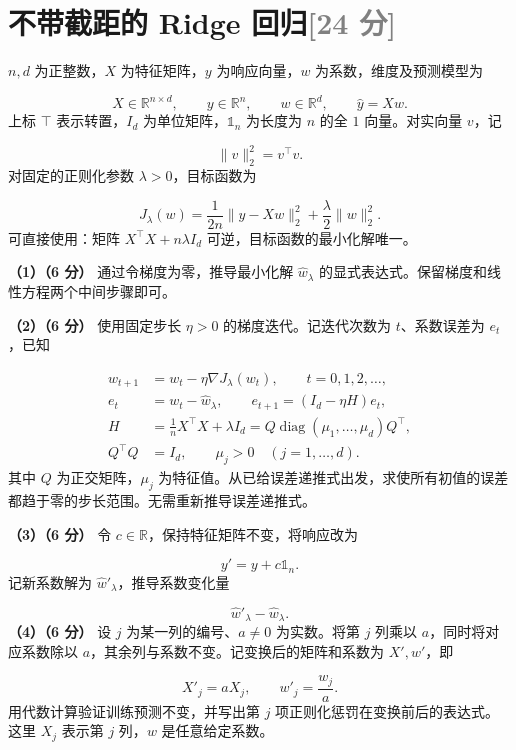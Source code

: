 \documentclass[11pt,a4paper]{article}
\begin{document}
\par\addvspace{1.2em}\noindent\begin{minipage}{\linewidth}
\section[不带截距的 Ridge 回归（24 分）]{不带截距的 Ridge 回归\hfill\textcolor{gray}{[24 分]}}
$n,d$ 为正整数，$X$ 为特征矩阵，$y$ 为响应向量，$w$ 为系数，维度及预测模型为


\[
X\in\mathbb R^{n\times d},\qquad y\in\mathbb R^n,\qquad
w\in\mathbb R^d,\qquad \widehat y=Xw.
\]
上标 $\top$ 表示转置，$I_d$ 为单位矩阵，$\mathds{1}_n$ 为长度为 $n$ 的全 $1$ 向量。对实向量 $v$，记


\[
\|v\|_2^2=v^\top v.
\]
对固定的正则化参数 $\lambda>0$，目标函数为


\[
J_\lambda(w)=\frac1{2n}\|y-Xw\|_2^2+\frac\lambda2\|w\|_2^2.
\]
可直接使用：矩阵 $X^\top X+n\lambda I_d$ 可逆，目标函数的最小化解唯一。

\textbf{（1）（6 分）} 通过令梯度为零，推导最小化解 $\widehat w_\lambda$ 的显式表达式。保留梯度和线性方程两个中间步骤即可。

\textbf{（2）（6 分）} 使用固定步长 $\eta>0$ 的梯度迭代。记迭代次数为 $t$、系数误差为 $e_t$，已知


\[
\begin{aligned}
w_{t+1}&=w_t-\eta\nabla J_\lambda(w_t),\qquad t=0,1,2,\ldots,\\
e_t&=w_t-\widehat w_\lambda,\qquad e_{t+1}=(I_d-\eta H)e_t,\\
H&=\frac1nX^\top X+\lambda I_d
=Q\operatorname{diag}(\mu_1,\ldots,\mu_d)Q^\top,\\
Q^\top Q&=I_d,\qquad \mu_j>0\quad(j=1,\ldots,d).
\end{aligned}
\]
其中 $Q$ 为正交矩阵，$\mu_j$ 为特征值。从已给误差递推式出发，求使所有初值的误差都趋于零的步长范围。无需重新推导误差递推式。

\textbf{（3）（6 分）} 令 $c\in\mathbb R$，保持特征矩阵不变，将响应改为


\[
y'=y+c\mathds{1}_n.
\]
记新系数解为 $\widehat w'_\lambda$，推导系数变化量


\[
\widehat w'_\lambda-\widehat w_\lambda.
\]
\textbf{（4）（6 分）} 设 $j$ 为某一列的编号、$a\ne0$ 为实数。将第 $j$ 列乘以 $a$，同时将对应系数除以 $a$，其余列与系数不变。记变换后的矩阵和系数为 $X',w'$，即


\[
X'_j=aX_j,\qquad w'_j=\frac{w_j}{a}.
\]
用代数计算验证训练预测不变，并写出第 $j$ 项正则化惩罚在变换前后的表达式。这里 $X_j$ 表示第 $j$ 列，$w$ 是任意给定系数。


\end{minipage}\par
\end{document}
